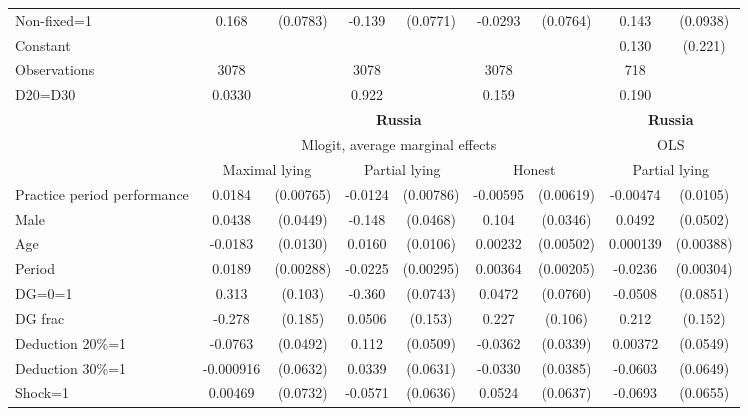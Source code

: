 \begin{tabular}{l|cccccc|cc}
Non-fixed=1     &    0.168\sym{**} & (0.0783)&   -0.139\sym{*}  & (0.0771)&  -0.0293         & (0.0764)&    0.143         & (0.0938)\\
Constant        &                  &         &                  &         &                  &         &    0.130         &  (0.221)\\
\hline
Observations    &     3078         &         &     3078         &         &     3078         &         &      718         &         \\
D20=D30         &   0.0330         &         &    0.922         &         &    0.159         &         &    0.190         &         \\
\hline\hline
&\multicolumn{6}{c|}{\bf Russia}&\multicolumn{2}{c}{\bf Russia}\\ &\multicolumn{6}{c|}{Mlogit, average marginal effects }&\multicolumn{2}{c}{OLS}\\
                &\multicolumn{2}{c}{Maximal lying}&\multicolumn{2}{c}{Partial lying}&\multicolumn{2}{c|}{Honest}  &\multicolumn{2}{c}{Partial lying}\\
\hline
Practice period performance&   0.0184\sym{**} &(0.00765)&  -0.0124         &(0.00786)& -0.00595         &(0.00619)& -0.00474         & (0.0105)\\
Male            &   0.0438         & (0.0449)&   -0.148\sym{***}& (0.0468)&    0.104\sym{***}& (0.0346)&   0.0492         & (0.0502)\\
Age             &  -0.0183         & (0.0130)&   0.0160         & (0.0106)&  0.00232         &(0.00502)& 0.000139         &(0.00388)\\
Period          &   0.0189\sym{***}&(0.00288)&  -0.0225\sym{***}&(0.00295)&  0.00364\sym{*}  &(0.00205)&  -0.0236\sym{***}&(0.00304)\\
DG=0=1          &    0.313\sym{***}&  (0.103)&   -0.360\sym{***}& (0.0743)&   0.0472         & (0.0760)&  -0.0508         & (0.0851)\\
DG frac         &   -0.278         &  (0.185)&   0.0506         &  (0.153)&    0.227\sym{**} &  (0.106)&    0.212         &  (0.152)\\
Deduction 20\%=1&  -0.0763         & (0.0492)&    0.112\sym{**} & (0.0509)&  -0.0362         & (0.0339)&  0.00372         & (0.0549)\\
Deduction 30\%=1&-0.000916         & (0.0632)&   0.0339         & (0.0631)&  -0.0330         & (0.0385)&  -0.0603         & (0.0649)\\
Shock=1         &  0.00469         & (0.0732)&  -0.0571         & (0.0636)&   0.0524         & (0.0637)&  -0.0693         & (0.0655)\\

\end{tabular}
